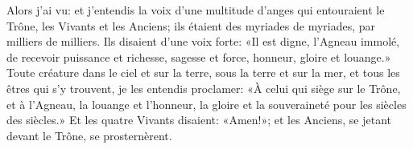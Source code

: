 Alors j’ai vu:
	et j’entendis la voix d’une multitude d’anges qui entouraient le Trône,
		les Vivants et les Anciens;
	ils étaient des myriades de myriades, par milliers de milliers.
Ils disaient d’une voix forte:
	«Il est digne, l’Agneau immolé,
	de recevoir puissance et richesse, sagesse et force, honneur, gloire et louange.»
Toute créature dans le ciel et sur la terre, sous la terre et sur la mer,
	et tous les êtres qui s’y trouvent, je les entendis proclamer:
	«À celui qui siège sur le Trône, et à l’Agneau,
	la louange et l’honneur, la gloire et la souveraineté pour les siècles des siècles.»
Et les quatre Vivants disaient: «Amen!»;
	et les Anciens, se jetant devant le Trône, se prosternèrent.
